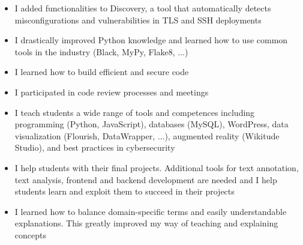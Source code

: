 \documentclass[10pt,a4paper,ragged2e,withhyper]{altacv}
\begin{document}

\makecvheader



\begin{paracol}{2}


\begin{itemize}
\item I added functionalities to Discovery, a tool that automatically detects misconfigurations and vulnerabilities in TLS and SSH deployments
\item I drastically improved Python knowledge and learned how to use common tools in the industry (Black, MyPy, Flake8, ...)
\item I learned how to build efficient and secure code
\item I participated in code review processes and meetings
\end{itemize}

\divider

\begin{itemize}
\item I teach students a wide range of tools and competences including programming (Python, JavaScript), databases (MySQL), WordPress, data visualization (Flourish, DataWrapper, ...), augmented reality (Wikitude Studio), and best practices in cybersecurity
\item I help students with their final projects. Additional tools for text annotation, text analysis, frontend and backend development are needed and I help students learn and exploit them to succeed in their projects
\item I learned how to balance domain-specific terms and easily understandable explanations. This greatly improved my way of teaching and explaining concepts
\end{itemize}



\end{paracol}
\end{document}
